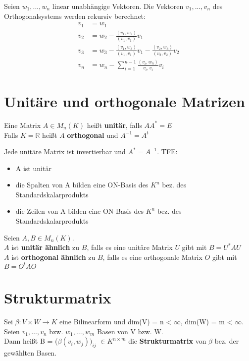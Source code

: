 
\begin{theorem}
Seien $w_1,...,w_n$ linear unabhängige Vektoren. Die Vektoren $v_1,...,v_n$ des Orthogonalsystems werden rekursiv berechnet:
\begin{align*}
v_1 &= w_1\\
v_2 &= w_2 - \frac{(v_1,w_2)}{(v_1,v_1)}v_1\\
v_3 &= w_3 - \frac{(v_1,w_3)}{(v_1,v_1)}v_1 - \frac{(v_2,w_3)}{(v_2,v_2)}v_2\\
v_n &= w_n - \sum_{i=1}^{n-1}\frac{(v_i,w_n)}{v_i,v_i}v_i
\end{align*}
\end{theorem}

\section{Unitäre und orthogonale Matrizen}
\begin{definition}
Eine Matrix $A \in M_n(K)$ heißt \textbf{unitär}, falls $AA^* = E$\\
Falls $K = \mathbb{R}$ heißt $A$ \textbf{orthogonal} und $A^{-1} = A^t$
\end{definition}
\begin{theorem}
Jede unitäre Matrix ist invertierbar und $A^* = A^{-1}$. TFE:
\begin{itemize}
	\item A ist unitär
	\item die Spalten von A bilden eine ON-Basis des $K^n$ bez. des Standardskalarprodukts
	\item die Zeilen von A bilden eine ON-Basis des $K^n$ bez. des Standardskalarprodukts
\end{itemize}
\end{theorem}

\begin{definition}
Seien $A, B \in M_n(K)$.\\
$A$ ist \textbf{unitär ähnlich} zu $B$, falls es eine unitäre Matrix $U$ gibt mit $B = U^*AU$\\
$A$ ist \textbf{orthogonal ähnlich} zu $B$, falls es eine orthogonale Matrix $O$ gibt mit $B = O^tAO$
\end{definition}

\section{Strukturmatrix}
\begin{definition}
Sei $\beta: V \times W \to K$ eine Bilinearform und dim(V) = n < $\infty$, dim(W) = m < $\infty$. Seien $v_1, …, v_n$ bzw. $w_1, …, w_m$ Basen von V bzw. W.\\
Dann heißt B = ($\beta(v_i, w_j))_{ij}$ $\in K^{n \times m}$ die \textbf{Strukturmatrix} von $\beta$ bez. der gewählten Basen.
\end{definition}

